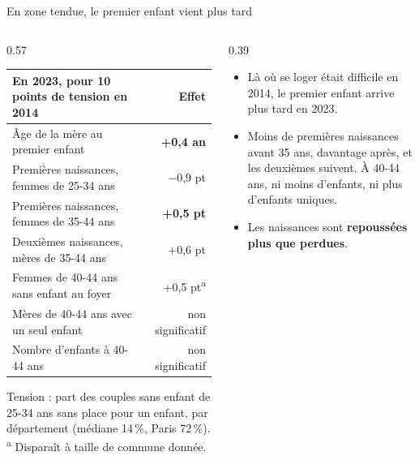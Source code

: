 \documentclass[10pt,aspectratio=169]{beamer}
\begin{document}
\begin{frame}{En zone tendue, le premier enfant vient plus tard}
  \begin{columns}[T]
    \begin{column}{0.57\textwidth}
      \footnotesize
      \begin{tabular}{@{}lr@{}}
        \toprule
        En 2023, pour 10 points de tension en 2014 & Effet \\
        \midrule
        Âge de la mère au premier enfant & \textbf{+0,4 an} \\
        Premières naissances, femmes de 25-34 ans & $-$0,9 pt \\
        Premières naissances, femmes de 35-44 ans & \textbf{+0,5 pt} \\
        Deuxièmes naissances, mères de 35-44 ans & +0,6 pt \\
        Femmes de 40-44 ans sans enfant au foyer & +0,5 pt\textsuperscript{a} \\
        Mères de 40-44 ans avec un seul enfant & non significatif \\
        Nombre d'enfants à 40-44 ans & non significatif \\
        \bottomrule
      \end{tabular}
      \par\vspace{3pt}
      {\scriptsize\color{tdtegrey} Tension : part des couples sans enfant de 25-34 ans sans place pour un enfant, par département (médiane 14\,\%, Paris 72\,\%). \textsuperscript{a} Disparaît à taille de commune donnée.}
    \end{column}
    \begin{column}{0.39\textwidth}
      \small
      \begin{itemize}\setlength{\itemsep}{0.5em}
        \item Là où se loger était difficile en 2014, le premier enfant arrive \alert{plus tard} en 2023.
        \item Moins de premières naissances avant 35 ans, davantage après, et les deuxièmes suivent. À 40-44 ans, ni moins d'enfants, ni plus d'enfants uniques.
        \item Les naissances sont \textbf{repoussées plus que perdues}.
      \end{itemize}
    \end{column}
  \end{columns}
\end{frame}
\end{document}

